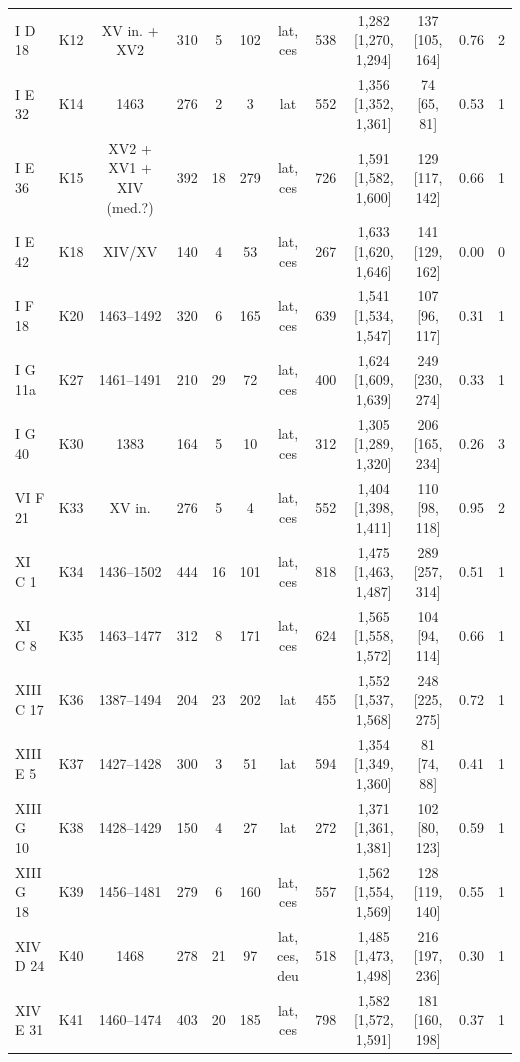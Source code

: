 \begin{table}[htbp]
\begin{tabular}{lccccccccccc}
    I D 18 & K12 & XV in. + XV2 & 310 & 5 & 102 & lat, ces & 538 & 1,282 [1,270, 1,294] & 137 [105, 164] & 0.76 & 2 \\
    I E 32 & K14 & 1463 & 276 & 2 & 3 & lat & 552 & 1,356 [1,352, 1,361] & 74 [65, 81] & 0.53 & 1 \\
    I E 36 & K15 & XV2 + XV1 + XIV (med.?) & 392 & 18 & 279 & lat, ces & 726 & 1,591 [1,582, 1,600] & 129 [117, 142] & 0.66 & 1 \\
    I E 42 & K18 & XIV/XV & 140 & 4 & 53 & lat, ces & 267 & 1,633 [1,620, 1,646] & 141 [129, 162] & 0.00 & 0 \\
    I F 18 & K20 & 1463--1492 & 320 & 6 & 165 & lat, ces & 639 & 1,541 [1,534, 1,547] & 107 [96, 117] & 0.31 & 1 \\
    I G 11a & K27 & 1461--1491 & 210 & 29 & 72 & lat, ces & 400 & 1,624 [1,609, 1,639] & 249 [230, 274] & 0.33 & 1 \\
    I G 40 & K30 & 1383 & 164 & 5 & 10 & lat, ces & 312 & 1,305 [1,289, 1,320] & 206 [165, 234] & 0.26 & 3 \\
    VI F 21 & K33 & XV in. & 276 & 5 & 4 & lat, ces & 552 & 1,404 [1,398, 1,411] & 110 [98, 118] & 0.95 & 2 \\
    XI C 1 & K34 & 1436--1502 & 444 & 16 & 101 & lat, ces & 818 & 1,475 [1,463, 1,487] & 289 [257, 314] & 0.51 & 1 \\
    XI C 8 & K35 & 1463--1477 & 312 & 8 & 171 & lat, ces & 624 & 1,565 [1,558, 1,572] & 104 [94, 114] & 0.66 & 1 \\
    XIII C 17 & K36 & 1387--1494 & 204 & 23 & 202 & lat & 455 & 1,552 [1,537, 1,568] & 248 [225, 275] & 0.72 & 1 \\
    XIII E 5 & K37 & 1427--1428 & 300 & 3 & 51 & lat & 594 & 1,354 [1,349, 1,360] & 81 [74, 88] & 0.41 & 1 \\
    XIII G 10 & K38 & 1428--1429 & 150 & 4 & 27 & lat & 272 & 1,371 [1,361, 1,381] & 102 [80, 123] & 0.59 & 1 \\
    XIII G 18 & K39 & 1456--1481 & 279 & 6 & 160 & lat, ces & 557 & 1,562 [1,554, 1,569] & 128 [119, 140] & 0.55 & 1 \\
    XIV D 24 & K40 & 1468 & 278 & 21 & 97 & lat, ces, deu & 518 & 1,485 [1,473, 1,498] & 216 [197, 236] & 0.30 & 1 \\
    XIV E 31 & K41 & 1460--1474 & 403 & 20 & 185 & lat, ces & 798 & 1,582 [1,572, 1,591] & 181 [160, 198] & 0.37 & 1 \\
    \bottomrule
  \end{tabular}
\end{table}
